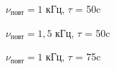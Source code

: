 \documentclass[a4paper, 12pt]{article}%
\begin{document}
\begin{enumerate}
\begin{figure}[H]
	\caption{$\nu_{\text{повт}} = 1$ кГц, $\tau$ = 50c}
\end{figure}

\begin{figure}[H]
	\caption{$\nu_{\text{повт}} = 1,5$ кГц, $\tau$ = 50c}
\end{figure}

	\newpage

\begin{figure}[H]
	\caption{$\nu_{\text{повт}} = 1$ кГц, $\tau$ = 75c}
\end{figure}
	

\end{enumerate}
\end{document}
